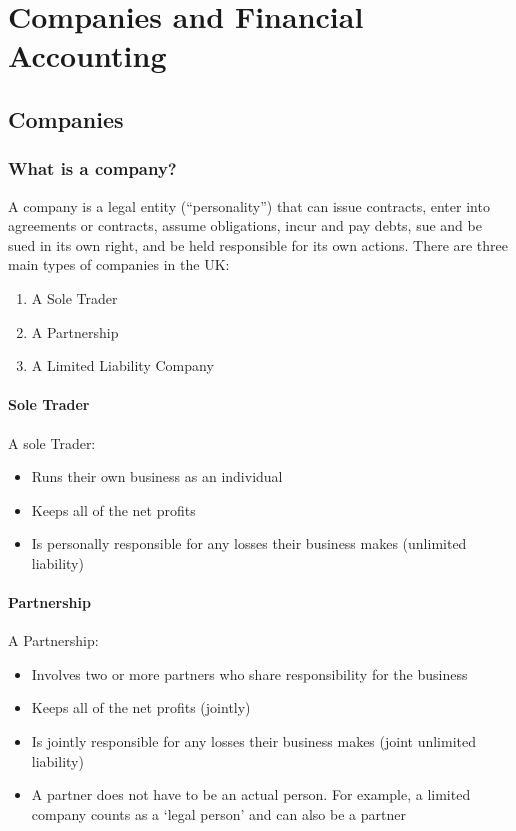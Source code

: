 \chapter{Companies and Financial Accounting}
\section{Companies}
\subsection{What is a company?}
A company is a legal entity (``personality'') that can issue contracts, enter into agreements or contracts, assume obligations, incur and pay debts, sue and be sued in its own right, and be held responsible for its own actions. There are three main types of companies in the UK:
\begin{enumerate}
    \item A Sole Trader
    \item A Partnership
    \item A Limited Liability Company
\end{enumerate}
\subsubsection{Sole Trader}
A sole Trader:
\begin{itemize}
    \item Runs their own business as an individual
    \item Keeps all of the net profits
    \item Is personally responsible for any losses their business makes (unlimited liability)
\end{itemize}
\subsubsection{Partnership}
A Partnership:
\begin{itemize}
    \item Involves two or more partners who share responsibility for the business
    \item Keeps all of the net profits (jointly)
    \item Is jointly responsible for any losses their business makes (joint unlimited liability)
    \item A partner does not have to be an actual person. For example, a limited company counts as a `legal person' and can also be a partner
\end{itemize}

